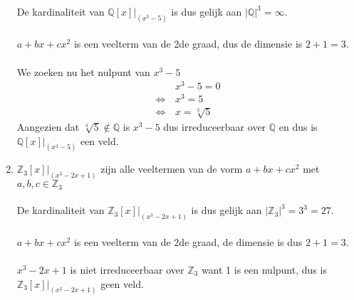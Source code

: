 \documentclass[11pt,a4paper,titlepage]{article}
\begin{document}
\begin{enumerate}[label=(\alph*)]
		De kardinaliteit van $\mathbb{Q}[x]|_{(x^3-5)}$ is dus gelijk aan $|\mathbb{Q}|^3 = \infty$. \\ \\
		$a + bx + cx^2$ is een veelterm van de 2de graad, dus de dimensie is $2 + 1 = 3$. \\ \\
		We zoeken nu het nulpunt van $x^3-5$
		\begin{align*}
			&\, x^3 - 5 = 0 \\
			\Leftrightarrow  &\, x^3 = 5 \\
			\Leftrightarrow  &\, x = \sqrt[3]{5}
		\end{align*}
		Aangezien dat $\sqrt[3]{5} \notin \mathbb{Q}$ is $x^3-5$ dus irreduceerbaar over $\mathbb{Q}$ en dus is $\mathbb{Q}[x]|_{(x^3-5)}$ een veld.
	\item $\mathbb{Z}_3[x]|_{(x^3-2x+1)}$ zijn alle veeltermen van de vorm  $a + bx + cx^2$ met $a,b,c \in \mathbb{Z}_3$ \\ \\
		De kardinaliteit van $\mathbb{Z}_3[x]|_{(x^3-2x+1)}$ is dus gelijk aan $|\mathbb{Z}_3|^3 = 3^3 = 27$. \\ \\
		 $a + bx + cx^2$ is een veelterm van de 2de graad, de dimensie is dus $2 + 1 = 3$. \\ \\
		$x^3-2x+1$ is niet irreduceerbaar over $\mathbb{Z}_3$ want 1 is een nulpunt, dus is $\mathbb{Z}_3[x]|_{(x^3-2x+1)}$ geen veld.
\end{enumerate}
\end{document}
